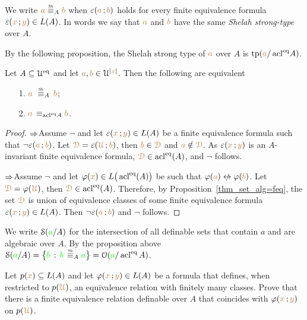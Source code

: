 \documentclass[creche.tex]{subfiles}
\begin{document}
\begin{definition}\label{def_Sh_strong_type}
We write \emph{${\mr a}\stackrel{\smash{\scalebox{.5}{\rm Sh}}}{\equiv}_A{\mr b}$} when $\varepsilon({\color{brown} a}\,;{\color{brown} b})$ holds for every finite equivalence formula $\varepsilon({\color{brown} x}\,;{\color{brown} y})\in L(A)$.
In words we say that ${\color{brown} a}$ and ${\color{brown} b}$ have the same \emph{Shelah strong-type\/} over $A$.\QED
\end{definition}

By the following proposition, the Shelah strong type of ${\color{brown} a}$ over $A$ is ${\rm tp}({\color{brown} a}/\mathop{\rm acl}^{{\rm eq}}\!A)$.


\begin{proposition}\label{prop_Shelah_strong_types}
Let $A\subseteq\EuScript U^{{\rm eq}}$ and let ${\color{brown} a},{\color{brown} b}\in\EuScript U^{|{\color{brown} x}|}$.
Then the following are equivalent\nobreak
\begin{itemize}
\item[1.]  ${\mr a}\ \equivSh_A\, {\mr b}$;
\item[2.]  ${\color{brown} a}\,\equiv_{\mathop{\rm acl}^{{\rm eq}}\! A}{\color{brown} b}$.
\end{itemize} 
\end{proposition}
\begin{proof}
$\Rightarrow$\quad Assume $\neg$ and let $\varepsilon({\color{brown} x}\,;{\color{brown} y})\in L(A)$ be a finite equivalence formula such that $\neg\varepsilon({\color{brown} a}\,;{\color{brown} b})$.
Let ${\color{brown}\EuScript D}=\varepsilon({\color{brown}\EuScript U}\,;{\color{brown} b})$, then  ${\color{brown} b}\in{\color{brown}\EuScript D}$ and ${\color{brown} a}\notin{\color{brown}\EuScript D}$.
As $\varepsilon({\color{brown} x}\,;{\color{brown} y})$ is an $A$-invariant finite equivalence formula, ${\color{brown}\EuScript D}\in\mathop{\rm acl}^{{\rm eq}}(A)$, and $\neg$ follows.


$\Rightarrow$\quad Assume $\neg$ and let $\varphi({\color{brown} x})\in L\big(\mathop{\rm acl}^{{\rm eq}}(A)\big)$ be  such that $\phi({\mr a})\niff\phi({\mr b})$.
Let ${\color{brown}\EuScript D}=\varphi({\color{brown}\EuScript U})$, then ${\color{brown}\EuScript D}\in\mathop{\rm acl}^{{\rm eq}}(A)$.
Therefore, by Proposition~\ref{thm_set_alg=feq}, the set ${\color{brown}\EuScript D}$ is union of equivalence classes of some finite equivalence formula $\varepsilon({\color{brown} x}\,;{\color{brown} y})\in L(A)$.
Then $\neg\varepsilon({\color{brown} a}\,;{\color{brown} b})$ and $\neg$ follows.
\end{proof}

\noindent\llap{\textcolor{red}{\Large\warning}\kern1.5ex}We write \emph{$\EuScript S({\color{green} a}/A)$\/} for the intersection of all definable sets that contain $a$ and are algebraic over $A$.
By the proposition above $\S({\gr a}/A)=\big\{{\gr b}\,:\,{\gr b}\,\equivSh_A {\gr a}\big\}=\O({\gr a}/\acl^\eq A)$.


\begin{exercise}
Let $p({\color{brown} x})\subseteq L(A)$ and let $\varphi({\color{brown} x}\,;{\color{brown} y})\in L(A)$ be a formula that defines, when restricted to $p({\color{brown}\EuScript U})$, an equivalence relation with finitely many classes.
Prove that there is a finite equivalence relation definable over $A$ that coincides with $\varphi({\color{brown} x}\,;{\color{brown} y})$ on $p({\color{brown}\EuScript U})$.\QED
\end{exercise}
\end{document}
